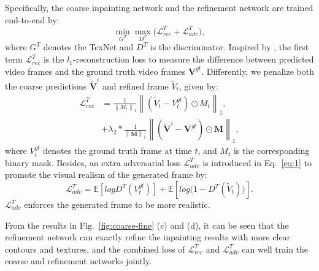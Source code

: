 

Specifically, the coarse inpainting network and the refinement network are trained end-to-end by:
%
\begin{equation}
	\label{eq:1}
	\min\limits_{G^T} \max \limits_{D^T} \big(\mathcal{L}^{T}_{rec}+\mathcal{L}^T_{adv}\big),
\end{equation}
where $G^T$ denotes the TexNet and $D^T$ is the discriminator.
%
Inspired by \cite{nazeri2019edgeconnect}, the first term $\mathcal{L}^{T}_{rec}$ is the $l_1$-reconstruction loss to measure the difference between predicted video frames and the ground truth video frames $\boldsymbol{V}^{gt}$.
Differently, we penalize both the coarse predictions $\boldsymbol{\widetilde{V}}^i$ and refined frame $\widetilde{V}_t$, given by:
\begin{equation}
		\label{eq:loss_rec}
	\begin{aligned}
		\mathcal{L}^{T}_{rec}&=\frac{1}{\left\|M_t \right\|_1}\left\|(\widetilde{V}_t-V^{gt}_t)\odot M_t\right\|_1,\\ 
		&+\lambda_2*\frac{1}{\left\|\boldsymbol{M} \right\|_1}\left\|(\boldsymbol{\widetilde{V}}^i-\boldsymbol{V}^{gt})\odot \boldsymbol{M}\right\|_1,
	\end{aligned}
\end{equation}
where $V^{gt}_t$ denotes the ground truth frame at time $t$, and $M_t$ is the corresponding binary mask. 
%
%
Besides, an extra adversarial loss $\mathcal{L}^T_{adv}$ is introduced in Eq.~\eqref{eq:1} to promote the visual realism of the generated frame
 by:
	\begin{equation}
		\label{eq:inp_adver}
		\mathcal{L}^T_{adv}=\mathbb{E}[logD^T(V^{gt}_t)]+\mathbb{E}[log\big(1-D^T(\widetilde{V}_t)\big)].
	\end{equation}
$\mathcal{L}^T_{adv}$ enforces the generated frame to be more realistic.

From the results in Fig.~\ref{fig:coarse-fine} (c) and (d), it can be seen that the refinement network can exactly refine the inpainting results with more clear contours and textures, and the combined loss of $\mathcal{L}^T_{rec}$ and $\mathcal{L}^T_{adv}$ can well train the coarse and refinement networks jointly.






